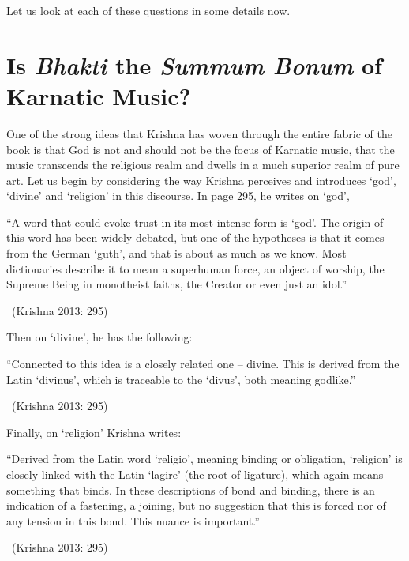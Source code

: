 Let us look at each of these questions in some details now.


\section*{Is \textit{Bhakti} the \textit{Summum Bonum} of Karnatic Music?}

One of the strong ideas that Krishna has woven through the entire fabric of the book is that God is not and should not be the focus of Karnatic music, that the music transcends the religious realm and dwells in a much superior realm of pure art. Let us begin by considering the way Krishna perceives and introduces ‘god’, ‘divine’ and ‘religion’ in this discourse. In page 295, he writes on ‘god’,

\begin{myquote}
“A word that could evoke trust in its most intense form is ‘god’. The origin of this word has been widely debated, but one of the hypotheses is that it comes from the German ‘guth’, and that is about as much as we know. Most dictionaries describe it to mean a superhuman force, an object of worship, the Supreme Being in monotheist faiths, the Creator or even just an idol.” 

~\hfill (Krishna 2013: 295)
\end{myquote}

Then on ‘divine’, he has the following:

\begin{myquote}
“Connected to this idea is a closely related one – divine. This is derived from the Latin ‘divinus’, which is traceable to the ‘divus’, both meaning godlike.” 

~\hfill (Krishna 2013: 295)
\end{myquote}

Finally, on ‘religion’ Krishna writes:

\begin{myquote}
“Derived from the Latin word ‘religio’, meaning binding or obligation, ‘religion’ is closely linked with the Latin ‘lagire’ (the root of ligature), which again means something that binds. In these descriptions of bond and binding, there is an indication of a fastening, a joining, but no suggestion that this is forced nor of any tension in this bond. This nuance is important.” 

~\hfill (Krishna 2013: 295)
\end{myquote}

\newpage

